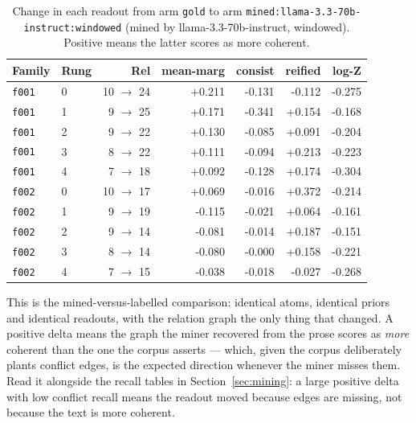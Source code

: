 \documentclass[11pt]{article}
\begin{document}
\begin{table}[htbp]
\centering
\small
\caption{Change in each readout from arm \texttt{gold} to arm \texttt{mined:llama-3.3-70b-instruct:windowed} (mined by llama-3.3-70b-instruct, windowed). Positive means the latter scores as more coherent.}
\label{tab:arm-delta-gold-mined-llama-3-3-70b-instruct-windowed}
\begin{tabular}{llrrrrr}
\toprule
Family & Rung & Rel & \textbf{mean-marg} & \textbf{consist} & \textbf{reified} & \textbf{log-Z} \\
\midrule
\texttt{f001} & 0 & 10 $\to$ 24 & +0.211 & -0.131 & -0.112 & -0.275 \\
\texttt{f001} & 1 & 9 $\to$ 25 & +0.171 & -0.341 & +0.154 & -0.168 \\
\texttt{f001} & 2 & 9 $\to$ 22 & +0.130 & -0.085 & +0.091 & -0.204 \\
\texttt{f001} & 3 & 8 $\to$ 22 & +0.111 & -0.094 & +0.213 & -0.223 \\
\texttt{f001} & 4 & 7 $\to$ 18 & +0.092 & -0.128 & +0.174 & -0.304 \\
\texttt{f002} & 0 & 10 $\to$ 17 & +0.069 & -0.016 & +0.372 & -0.214 \\
\texttt{f002} & 1 & 9 $\to$ 19 & -0.115 & -0.021 & +0.064 & -0.161 \\
\texttt{f002} & 2 & 9 $\to$ 14 & -0.081 & -0.014 & +0.187 & -0.151 \\
\texttt{f002} & 3 & 8 $\to$ 14 & -0.080 & -0.000 & +0.158 & -0.221 \\
\texttt{f002} & 4 & 7 $\to$ 15 & -0.038 & -0.018 & -0.027 & -0.268 \\
\bottomrule
\end{tabular}
\end{table}

This is the mined-versus-labelled comparison: identical atoms, identical priors and identical readouts, with the relation graph the only thing that changed. A positive delta means the graph the miner recovered from the prose scores as \emph{more} coherent than the one the corpus asserts --- which, given the corpus deliberately plants conflict edges, is the expected direction whenever the miner misses them. Read it alongside the recall tables in Section~\ref{sec:mining}: a large positive delta with low conflict recall means the readout moved because edges are missing, not because the text is more coherent.
\end{document}

